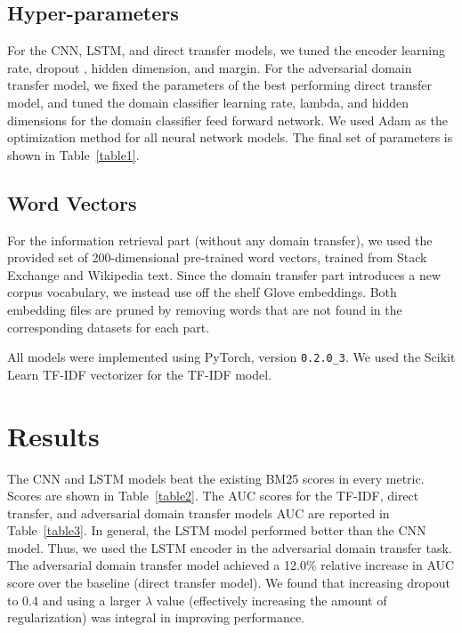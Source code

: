 \documentclass[11pt,a4paper]{article}
\begin{document}
\subsection*{Hyper-parameters}
For the CNN, LSTM, and direct transfer models, we tuned the encoder learning rate, dropout \cite{hinton}, hidden dimension, and margin. For the adversarial domain transfer model, we fixed the parameters of the best performing direct transfer model, and tuned the domain classifier learning rate, lambda, and hidden dimensions for the domain classifier feed forward network. We used Adam \cite{kingma} as the optimization method for all neural network models. The final set of parameters is shown in Table~\ref{table1}. 

\subsection*{Word Vectors}
For the information retrieval part (without any domain transfer), we used the provided set of 200-dimensional pre-trained word vectors, trained from Stack Exchange and Wikipedia text. Since the domain transfer part introduces a new corpus vocabulary, we instead use off the shelf Glove \cite{pennington} embeddings. Both embedding files are pruned by removing words that are not found in the corresponding datasets for each part. 

All models were implemented using PyTorch, version \texttt{0.2.0\_3}. We used the Scikit Learn TF-IDF vectorizer for the TF-IDF model.

\section{Results}
The CNN and LSTM models beat the existing BM25 scores in every metric. Scores are shown in Table~\ref{table2}. The AUC scores for the TF-IDF, direct transfer, and adversarial domain transfer models AUC are reported in Table~\ref{table3}. In general, the LSTM model performed better than the CNN model. Thus, we used the LSTM encoder in the adversarial domain transfer task. The adversarial domain transfer model achieved a 12.0\% relative increase in AUC score over the baseline (direct transfer model). We found that increasing dropout to 0.4 and using a larger $\lambda$ value (effectively increasing the amount of regularization) was integral in improving performance. 
\end{document}
